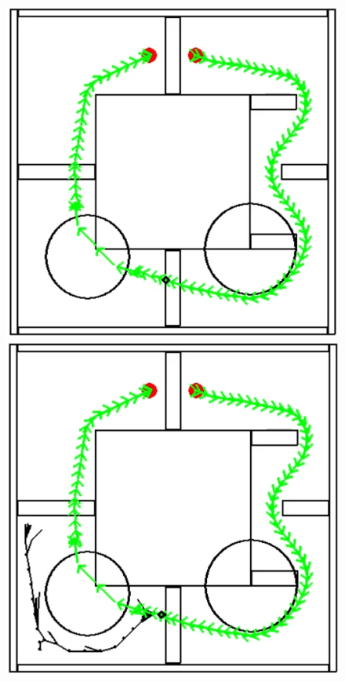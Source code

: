 \begin{figure}[!htb]
    \centering
    \begin{minipage}[b]{.3\linewidth}
        \centering
        \includegraphics[width=0.8\linewidth]{Figures/07_simulation/basic/08basic.png}
    \end{minipage}%
    \hfill%
    \begin{minipage}[b]{.3\linewidth}
        \centering
        \centering
        \includegraphics[width=0.8\linewidth]{Figures/07_simulation/basic/09basic.png}
    \end{minipage}%
    \hfill%
    \begin{minipage}[b]{.3\linewidth}

\end{minipage}
\end{figure}
